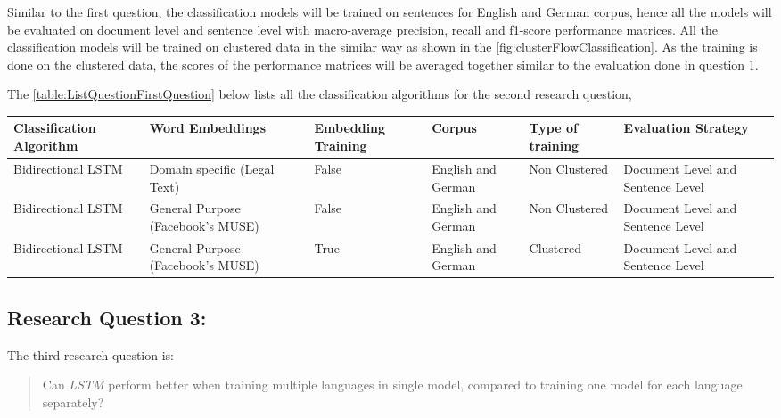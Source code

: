 Similar to the first question, the classification models will be trained on sentences for English and German corpus, hence all the models will be evaluated on document level and sentence level with macro-average precision, recall and f1-score performance matrices. All the classification models will be trained on clustered data in the similar way as shown in the  \ref{fig:clusterFlowClassification}. As the training is done on the clustered data, the scores of the performance matrices will be averaged together similar to the evaluation done in question 1.

The \ref{table:ListQuestionFirstQuestion} below lists all the classification algorithms for the second research question,
\begin{table}[!ht]
\begin{tabular}{>{\centering\arraybackslash}m{2cm}>{\centering\arraybackslash}m{2.9cm}>{\centering\arraybackslash}m{1.8cm}>{\centering\arraybackslash}m{2cm}>{\centering\arraybackslash}m{1.9cm}>{\centering\arraybackslash}m{2cm}}
\hline
\textbf{Classification Algorithm} & \textbf{Word Embeddings} & \textbf{Embedding Training} & \textbf{Corpus} & \textbf{Type of training} & \textbf{Evaluation Strategy} \\ \hline
Bidirectional LSTM & Domain specific (Legal Text) & False & English and German & Non Clustered & Document Level and Sentence Level \\
Bidirectional LSTM & General Purpose (Facebook's MUSE) & False & English and German & Non Clustered & Document Level and Sentence Level \\
Bidirectional LSTM & General Purpose (Facebook's MUSE) & True & English and German & Clustered & Document Level and Sentence Level \\ \hline
\end{tabular}
\end{table}

\subsection{Research Question 3:} \label{question3}

The third research question is:

\begin{quote}
    Can \textit{LSTM} perform better when training multiple languages in single model, compared to training one model for each language separately?
\end{quote}

